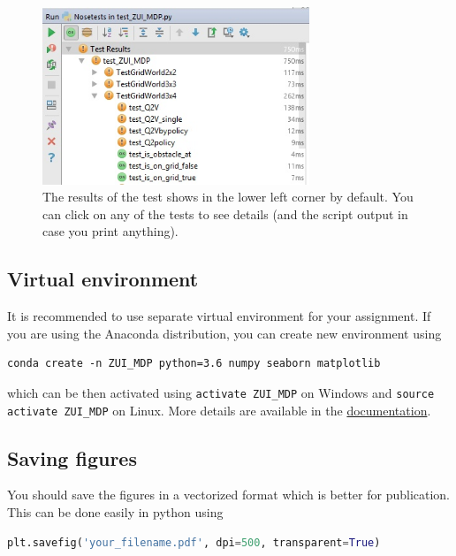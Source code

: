 \documentclass[10pt,journal,compsoc,twoside]{IEEEtran}
\begin{document}
\begin{figure}[t]
    \includegraphics[width=8cm]{figures/pycharm_nosetests_results.jpg}
    \centering
    \caption{The results of the test shows in the lower left corner by default. You can click on any of the tests to see details (and the script output in case you print anything).}
    \label{fig:nosetests_results}
\end{figure}


\subsection{Virtual environment}
It is recommended to use separate virtual environment for your assignment. If you are using the Anaconda distribution, you can create new environment using

\begin{lstlisting}[language=none]
conda create -n ZUI_MDP python=3.6 numpy seaborn matplotlib
\end{lstlisting}

which can be then activated using \lstinline[language=none]{activate ZUI_MDP} on Windows and \lstinline[language=none]{source activate ZUI_MDP} on Linux. More details are available in the \href{https://conda.io/docs/user-guide/tasks/manage-environments.html}{documentation}.

\subsection{Saving figures}
You should save the figures in a vectorized format which is better for publication. This can be done easily in python using 

\begin{lstlisting}[language=python]
plt.savefig('your_filename.pdf', dpi=500, transparent=True)
\end{lstlisting}

\end{document}
